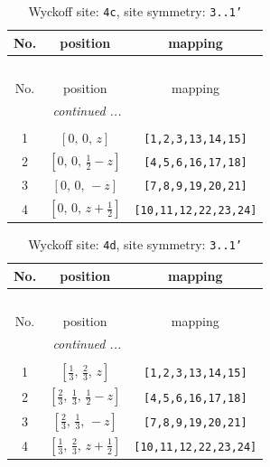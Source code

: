 \documentclass[fleqn,8pt]{jsarticle}
\begin{document}
\renewcommand{\arraystretch}{1.2}
\begin{longtable}{ccc}
\caption{Wyckoff site: {\tt 4c}, site symmetry: {\tt 3..1'}}
 \\
 \hline \hline
No. & position & mapping \\ \hline \endfirsthead

\multicolumn{2}{l}{\tablename\ \thetable{}} \\
 \hline \hline
No. & position & mapping \\ \hline \endhead

 \hline \hline
\multicolumn{2}{r}{\footnotesize\it continued ...} \\ \endfoot

 \hline \hline
\multicolumn{2}{r}{} \\ \endlastfoot

1 & $\left[ 0,\, 0,\, z \right]$ & {\tt [1,2,3,13,14,15]} \\ \hline
2 & $\left[ 0,\, 0,\, \frac{1}{2} - z \right]$ & {\tt [4,5,6,16,17,18]} \\ \hline
3 & $\left[ 0,\, 0,\, - z \right]$ & {\tt [7,8,9,19,20,21]} \\ \hline
4 & $\left[ 0,\, 0,\, z + \frac{1}{2} \right]$ & {\tt [10,11,12,22,23,24]} \\
\end{longtable}
\renewcommand{\arraystretch}{1.2}
\begin{longtable}{ccc}
\caption{Wyckoff site: {\tt 4d}, site symmetry: {\tt 3..1'}}
 \\
 \hline \hline
No. & position & mapping \\ \hline \endfirsthead

\multicolumn{2}{l}{\tablename\ \thetable{}} \\
 \hline \hline
No. & position & mapping \\ \hline \endhead

 \hline \hline
\multicolumn{2}{r}{\footnotesize\it continued ...} \\ \endfoot

 \hline \hline
\multicolumn{2}{r}{} \\ \endlastfoot

1 & $\left[ \frac{1}{3},\, \frac{2}{3},\, z \right]$ & {\tt [1,2,3,13,14,15]} \\ \hline
2 & $\left[ \frac{2}{3},\, \frac{1}{3},\, \frac{1}{2} - z \right]$ & {\tt [4,5,6,16,17,18]} \\ \hline
3 & $\left[ \frac{2}{3},\, \frac{1}{3},\, - z \right]$ & {\tt [7,8,9,19,20,21]} \\ \hline
4 & $\left[ \frac{1}{3},\, \frac{2}{3},\, z + \frac{1}{2} \right]$ & {\tt [10,11,12,22,23,24]} \\
\end{longtable}
\end{document}
